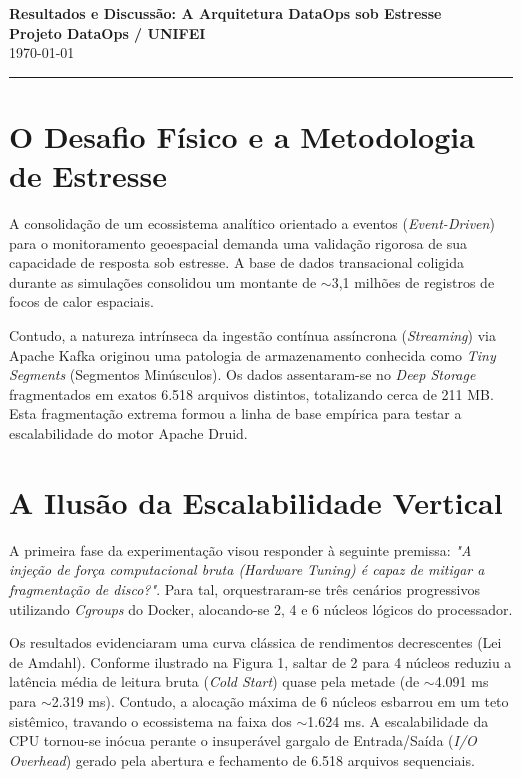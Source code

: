 \documentclass[12pt, a4paper]{article}
\begin{document}
\begin{center}
    \Large\textbf{Resultados e Discussão: A Arquitetura DataOps sob Estresse} \\[0.5cm]
    \normalsize\textbf{Projeto DataOps / UNIFEI} \\
    \small{\today}
\end{center}

\vspace{0.5cm}
\noindent\rule{\textwidth}{1pt}

\section{O Desafio Físico e a Metodologia de Estresse}
A consolidação de um ecossistema analítico orientado a eventos (\textit{Event-Driven}) para o monitoramento geoespacial demanda uma validação rigorosa de sua capacidade de resposta sob estresse. A base de dados transacional coligida durante as simulações consolidou um montante de $\sim$3,1 milhões de registros de focos de calor espaciais. 

Contudo, a natureza intrínseca da ingestão contínua assíncrona (\textit{Streaming}) via Apache Kafka originou uma patologia de armazenamento conhecida como \textit{Tiny Segments} (Segmentos Minúsculos). Os dados assentaram-se no \textit{Deep Storage} fragmentados em exatos 6.518 arquivos distintos, totalizando cerca de 211 MB. Esta fragmentação extrema formou a linha de base empírica para testar a escalabilidade do motor Apache Druid.

\section{A Ilusão da Escalabilidade Vertical}
A primeira fase da experimentação visou responder à seguinte premissa: \textit{"A injeção de força computacional bruta (Hardware Tuning) é capaz de mitigar a fragmentação de disco?"}. Para tal, orquestraram-se três cenários progressivos utilizando \textit{Cgroups} do Docker, alocando-se 2, 4 e 6 núcleos lógicos do processador.

Os resultados evidenciaram uma curva clássica de rendimentos decrescentes (Lei de Amdahl). Conforme ilustrado na Figura 1, saltar de 2 para 4 núcleos reduziu a latência média de leitura bruta (\textit{Cold Start}) quase pela metade (de $\sim$4.091 ms para $\sim$2.319 ms). Contudo, a alocação máxima de 6 núcleos esbarrou em um teto sistêmico, travando o ecossistema na faixa dos $\sim$1.624 ms. A escalabilidade da CPU tornou-se inócua perante o insuperável gargalo de Entrada/Saída (\textit{I/O Overhead}) gerado pela abertura e fechamento de 6.518 arquivos sequenciais.
\end{document}
